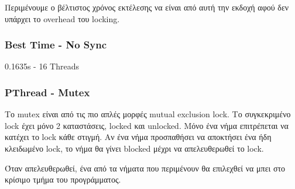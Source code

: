 \documentclass[../final_report.tex]{subfiles}
\begin{document}
Περιμένουμε ο βέλτιστος χρόνος εκτέλεσης να είναι από αυτή την εκδοχή αφού δεν υπάρχει το overhead
του locking.

\subsubsection*{Best Time - No Sync}
0.1635s - 16 Threads

\subsubsection{PThread - Mutex}

Το mutex είναι από τις πιο απλές μορφές mutual exclusion lock. Το συγκεκριμένο lock έχει μόνο 2 καταστάσεις,
locked και unlocked. Μόνο ένα νήμα επιτρέπεται να κατέχει το lock κάθε στιγμή. Αν ένα νήμα προσπαθήσει να 
αποκτήσει ένα ήδη κλειδωμένο lock, το νήμα θα γίνει blocked μέχρι να απελευθερωθεί το lock.

Όταν απελευθερωθεί, ένα από τα νήματα που περιμένουν θα επιλεχθεί να μπει στο κρίσιμο τμήμα του
προγράμματος.
\end{document}
